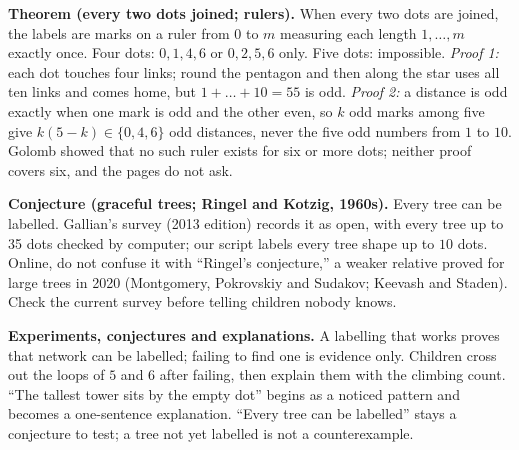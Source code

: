 \documentclass[11pt]{article}
\begin{document}
\textbf{Theorem (every two dots joined; rulers).} When every two dots are joined, the labels are marks on a ruler from $0$ to $m$ measuring each length $1,\dots,m$ exactly once. Four dots: $0,1,4,6$ or $0,2,5,6$ only. Five dots: impossible. \emph{Proof 1:} each dot touches four links; round the pentagon and then along the star uses all ten links and comes home, but $1+\dots+10=55$ is odd. \emph{Proof 2:} a distance is odd exactly when one mark is odd and the other even, so $k$ odd marks among five give $k(5-k)\in\{0,4,6\}$ odd distances, never the five odd numbers from $1$ to $10$. Golomb showed that no such ruler exists for six or more dots; neither proof covers six, and the pages do not ask.

\textbf{Conjecture (graceful trees; Ringel and Kotzig, 1960s).} Every tree can be labelled. Gallian's survey (2013 edition) records it as open, with every tree up to 35 dots checked by computer; our script labels every tree shape up to $10$ dots. Online, do not confuse it with ``Ringel's conjecture,'' a weaker relative proved for large trees in 2020 (Montgomery, Pokrovskiy and Sudakov; Keevash and Staden). Check the current survey before telling children nobody knows.

\textbf{Experiments, conjectures and explanations.} A labelling that works proves that network can be labelled; failing to find one is evidence only. Children cross out the loops of $5$ and $6$ after failing, then explain them with the climbing count. ``The tallest tower sits by the empty dot'' begins as a noticed pattern and becomes a one-sentence explanation. ``Every tree can be labelled'' stays a conjecture to test; a tree not yet labelled is not a counterexample.
\end{document}
